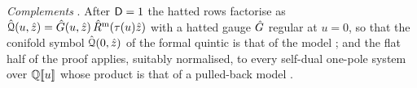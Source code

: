  

\emph{Complements} . After $\mathsf{D}=1$ the hatted rows factorise as $\hat{\mathcal{Q}}(u,\hat{z})=\hat{G}(u,\hat{z})\,\hat{R}^{\mathrm m}(\tau(u)\hat{z})$ with a hatted gauge $\hat{G}$ regular at $u=0$, so that the conifold symbol $\hat{\mathcal{Q}}(0,\hat{z})$ of the formal quintic is that of the model ; and the flat half of the proof applies, suitably normalised, to every self-dual one-pole system over $\mathbb{Q}[\![ u ]\!]$ whose product is that of a pulled-back model .
